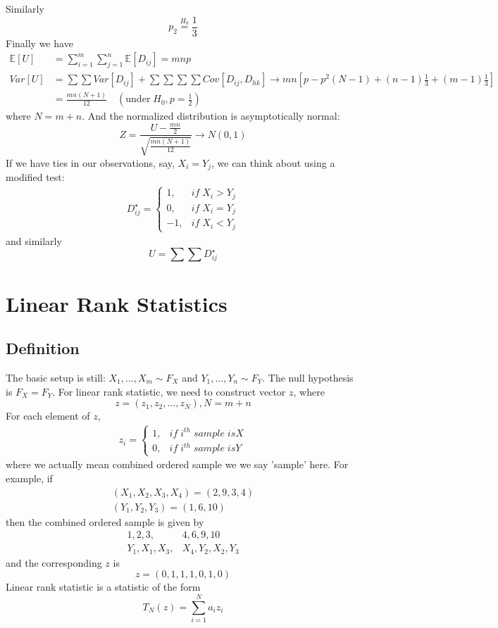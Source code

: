 \documentclass[twoside]{article}
\begin{document}
	Similarly
	$$
	p_2 \stackrel{H_0}{=} \frac{1}{3}
	$$
	Finally we have
	\begin{align*}
		\mathbb{E} \left[ U \right] &= \sum_{i=1}^{m} \sum_{j=1}^{n} \mathbb{E} \left[ D_{ij} \right] = mnp \\
		Var \left[ U \right] &= \sum \sum Var \left[ D_{ij} \right] + \sum \sum \sum \sum Cov \left[ D_{ij}, D_{hk} \right] \to mn[p - p^2 (N-1) + (n-1) \frac{1}{3} + (m-1) \frac{1}{3}] \\
		&= \frac{mn(N+1)}{12} \quad (\mathrm{under} \; H_0, p = \frac{1}{2})
	\end{align*}
	where $N = m+n$. And the normalized distribution is asymptotically normal: 
	$$
	Z = \frac{U - \frac{mn}{2}}{\sqrt{\frac{mn(N+1)}{12}}} \rightarrow N(0,1)
	$$
	If we have ties in our observations, say, $X_i = Y_j$, we can think about using a modified test: 
	\begin{align*}
		D_{ij}^{\star} = \begin{cases}
			1, &if \; X_i > Y_j \\
			0, &if \; X_i = Y_j \\
			-1, &if \; X_i < Y_j
		\end{cases}
	\end{align*}
	and similarly
	$$
	U = \sum \sum D_{ij}^{\star}
	$$
	
	\section{Linear Rank Statistics}
	\subsection{Definition}
	The basic setup is still: $X_1, ..., X_m \sim F_X$ and $Y_1, ..., Y_n \sim F_Y$. The null hypothesis is $F_X = F_Y$. For linear rank statistic, we need to construct vector $z$, where
	$$
	z = \left( z_1, z_2, ..., z_N \right), N=m+n
	$$
	For each element of $z$, 
	\begin{align*}
		z_i = \begin{cases}
			1, &if \; i^{th} \; sample \; is X \\
			0, &if \; i^{th} \; sample \; is Y
		\end{cases}
	\end{align*}
	where we actually mean combined ordered sample we we say 'sample' here. For example, if
	\begin{align*}
		(X_1, X_2, X_3, X_4) = (2, 9, 3, 4) \\
		(Y_1, Y_2, Y_3) = (1,6,10)
	\end{align*}
	then the combined ordered sample is given by
	\begin{align*}
		1, 2, 3, &4, 6, 9, 10 \\
		Y_1, X_1, X_3, &X_4, Y_2, X_2, Y_3 
	\end{align*}
	and the corresponding $z$ is
	$$
	z = (0, 1, 1, 1, 0, 1, 0)
	$$
	Linear rank statistic is  a statistic of the form
	$$
	T_N(z) = \sum_{i=1}^{N} a_i z_i
	$$
	
\end{document}
